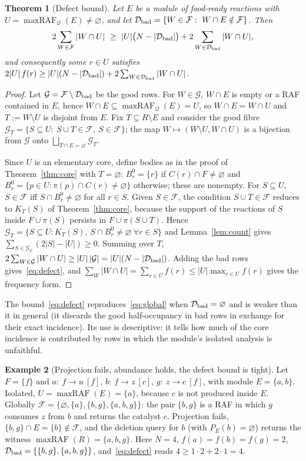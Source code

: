 \documentclass[11pt,a4paper]{article}
\theoremstyle{plain}
\newtheorem{theorem}{Theorem}[section]
\theoremstyle{definition}
\newtheorem{example}[theorem]{Example}
\theoremstyle{remark}
\newcommand{\FF}{\mathcal F}
\newcommand{\DD}{\mathcal D}
\newcommand{\GG}{\mathcal G}
\newcommand{\QQ}{\mathcal Q}
\newcommand{\mraf}{\operatorname{maxRAF}}
\begin{document}
\begin{theorem}[Defect bound]\label{thm:defect}
Let $E$ be a module of food-ready reactions with $U=\mraf_\QQ(E)\neq\varnothing$, and let
$\DD_{\rm bad}=\{W\in\FF:\ W\cap E\notin\FF\}$. Then
\begin{equation}\label{eq:defect}
2\sum_{W\in\FF}|W\cap U|\ \ge\ |U|\bigl(N-|\DD_{\rm bad}|\bigr)+2\sum_{W\in\DD_{\rm bad}}|W\cap U| ,
\end{equation}
and consequently some $r\in U$ satisfies
$2|U|\,f(r)\ge|U|(N-|\DD_{\rm bad}|)+2\sum_{W\in\DD_{\rm bad}}|W\cap U|$.
\end{theorem}
\begin{proof}
Let $\GG=\FF\setminus\DD_{\rm bad}$ be the good rows. For $W\in\GG$, $W\cap E$ is empty or a
RAF contained in $E$, hence $W\cap E\subseteq\mraf_\QQ(E)=U$, so $W\cap E=W\cap U$ and
$T:=W\setminus U$ is disjoint from $E$. Fix $T\subseteq R\setminus E$ and consider the good
fibre $\GG_T=\{S\subseteq U:\ S\cup T\in\FF,\ S\in\FF\}$; the map $W\mapsto(W\setminus U,W\cap U)$
is a bijection from $\GG$ onto $\bigsqcup_{T\cap E=\varnothing}\GG_T$.

Since $U$ is an elementary core, define bodies as in the proof of Theorem~\ref{thm:core}
with $T=\varnothing$: $B^0_r=\{r\}$ if $C(r)\cap F\neq\varnothing$ and
$B^0_r=\{p\in U:\pi(p)\cap C(r)\neq\varnothing\}$ otherwise; these are nonempty. For
$S\subseteq U$, $S\in\FF$ iff $S\cap B^0_r\neq\varnothing$ for all $r\in S$. Given $S\in\FF$,
the condition $S\cup T\in\FF$ reduces to $K_T(S)$ of Theorem~\ref{thm:core}, because the
support of the reactions of $S$ inside $F\cup\pi(S)$ persists in $F\cup\pi(S\cup T)$. Hence
$\GG_T=\{S\subseteq U: K_T(S),\ S\cap B^0_r\neq\varnothing\ \forall r\in S\}$ and
Lemma~\ref{lem:count} gives $\sum_{S\in\GG_T}(2|S|-|U|)\ge0$. Summing over $T$,
$2\sum_{W\in\GG}|W\cap U|\ge|U|\,|\GG|=|U|(N-|\DD_{\rm bad}|)$. Adding the bad rows
gives~\eqref{eq:defect}, and $\sum_W|W\cap U|=\sum_{r\in U}f(r)\le|U|\max_{r\in U}f(r)$ gives
the frequency form.
\end{proof}

The bound~\eqref{eq:defect} reproduces~\eqref{eq:global} when $\DD_{\rm bad}=\varnothing$ and
is weaker than it in general (it discards the good half-occupancy in bad rows in exchange
for their exact incidence). Its use is descriptive: it tells how much of the core incidence
is contributed by rows in which the module's isolated analysis is unfaithful.

\begin{example}[Projection fails, abundance holds, the defect bound is tight]\label{ex:failed-projection}
Let $F=\{f\}$ and $a:\ f\to u\ [f]$, $b:\ f\to z\ [c]$, $g:\ z\to c\ [f]$, with module
$E=\{a,b\}$. Isolated, $U=\mraf(E)=\{a\}$, because $c$ is not produced inside $E$. Globally
$\FF=\{\varnothing,\{a\},\{b,g\},\{a,b,g\}\}$: the pair $\{b,g\}$ is a RAF in which $g$
consumes $z$ from $b$ and returns the catalyst $c$. Projection fails,
$\{b,g\}\cap E=\{b\}\notin\FF$, and the deletion query for $b$ (with $P_E(b)=\varnothing$)
returns the witness $\mraf(R)=\{a,b,g\}$. Here $N=4$, $f(a)=f(b)=f(g)=2$,
$\DD_{\rm bad}=\{\{b,g\},\{a,b,g\}\}$, and~\eqref{eq:defect} reads $4\ge1\cdot2+2\cdot1=4$.
\end{example}
\end{document}
